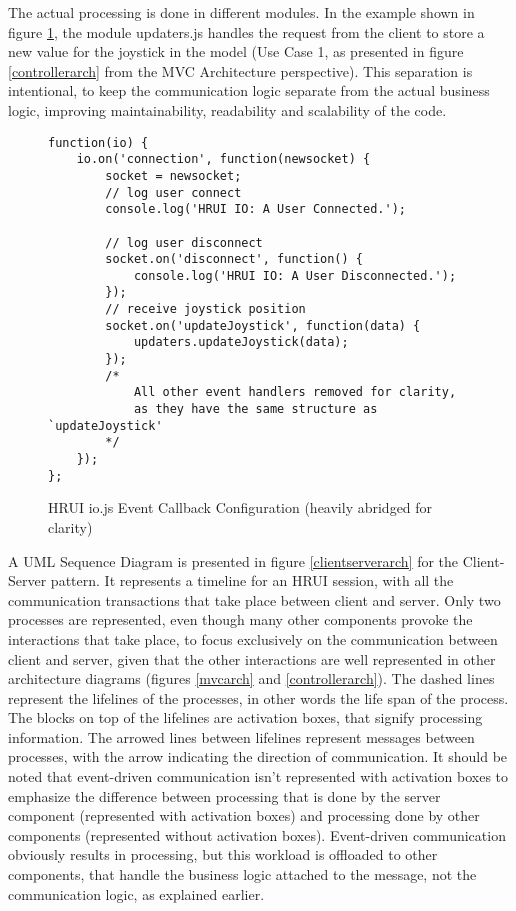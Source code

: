The actual processing is done in different modules. In the example shown in figure \ref{iojs}, the module updaters.js handles 
the request from the client to store a new value for the joystick in the model (Use Case 1, as presented in figure 
\ref{controllerarch} from the MVC Architecture perspective). This separation is intentional, to keep the communication logic 
separate from the actual business logic, improving maintainability, readability and scalability of the code.\\
\begin{figure}[H]
\centering
\captionsetup{justification=centering}
\begin{verbatim}
function(io) {
    io.on('connection', function(newsocket) {
        socket = newsocket;
        // log user connect
        console.log('HRUI IO: A User Connected.');

        // log user disconnect
        socket.on('disconnect', function() {
            console.log('HRUI IO: A User Disconnected.');
        });
        // receive joystick position
        socket.on('updateJoystick', function(data) {
            updaters.updateJoystick(data);
        });
        /* 
        	All other event handlers removed for clarity,
        	as they have the same structure as `updateJoystick'
        */
    });
};
\end{verbatim}
\caption{HRUI io.js Event Callback Configuration (heavily abridged for clarity)\label{iojs}}
\end{figure}

A UML Sequence Diagram is presented in figure \ref{clientserverarch} for the Client-Server pattern. It represents a timeline 
for an HRUI session, with all the communication transactions that take place between client and server. Only two processes are 
represented, even though many other components provoke the interactions that take place, to focus exclusively on the 
communication between client and server, given that the other interactions are well represented in other architecture diagrams 
(figures \ref{mvcarch} and \ref{controllerarch}). The dashed lines represent the lifelines of the processes, in other words 
the life span of the process. The blocks on top of the lifelines are activation boxes, that signify processing information. 
The arrowed lines between lifelines represent messages between processes, with the arrow indicating the direction of 
communication. It should be noted that event-driven communication isn't represented with activation boxes to emphasize the 
difference between processing that is done by the server component (represented with activation boxes) and processing done by 
other components (represented without activation boxes). Event-driven communication obviously results in processing, but this 
workload is offloaded to other components, that handle the business logic attached to the message, not the communication 
logic, as explained earlier.\\

